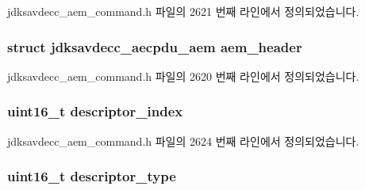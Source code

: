 jdksavdecc\+\_\+aem\+\_\+command.\+h 파일의 2621 번째 라인에서 정의되었습니다.

\subsubsection[{\texorpdfstring{aem\+\_\+header}{aem_header}}]{\setlength{\rightskip}{0pt plus 5cm}struct {\bf jdksavdecc\+\_\+aecpdu\+\_\+aem} aem\+\_\+header}\hypertarget{structjdksavdecc__aem__command__acquire__entity_ae1e77ccb75ff5021ad923221eab38294}{}\label{structjdksavdecc__aem__command__acquire__entity_ae1e77ccb75ff5021ad923221eab38294}


jdksavdecc\+\_\+aem\+\_\+command.\+h 파일의 2620 번째 라인에서 정의되었습니다.

\subsubsection[{\texorpdfstring{descriptor\+\_\+index}{descriptor_index}}]{\setlength{\rightskip}{0pt plus 5cm}uint16\+\_\+t descriptor\+\_\+index}\hypertarget{structjdksavdecc__aem__command__acquire__entity_a042bbc76d835b82d27c1932431ee38d4}{}\label{structjdksavdecc__aem__command__acquire__entity_a042bbc76d835b82d27c1932431ee38d4}


jdksavdecc\+\_\+aem\+\_\+command.\+h 파일의 2624 번째 라인에서 정의되었습니다.

\subsubsection[{\texorpdfstring{descriptor\+\_\+type}{descriptor_type}}]{\setlength{\rightskip}{0pt plus 5cm}uint16\+\_\+t descriptor\+\_\+type}\hypertarget{structjdksavdecc__aem__command__acquire__entity_ab7c32b6c7131c13d4ea3b7ee2f09b78d}{}\label{structjdksavdecc__aem__command__acquire__entity_ab7c32b6c7131c13d4ea3b7ee2f09b78d}


